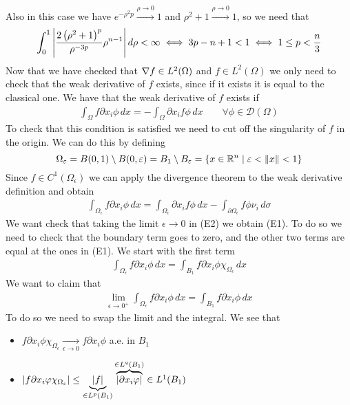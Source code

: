 Also in this case we have \(e^{-\rho^2 p} \overset{\rho \to 0}{\longrightarrow} 1\) and \(\rho^2 + 1 \overset{\rho \to 0}{\longrightarrow} 1\), so we need that
\[
    \begin{split}
        \int_0^1 \abs{\frac{2 \left(\rho^2 + 1\right)^p} {\rho^{-3p}} \rho^{n-1}} \, d\rho < \infty \iff 3p - n + 1 < 1 \iff 1 \leq p < \frac{n}{3}
    \end{split}
\]
Now that we have checked that \(\nabla f \in L^2(\Omega)\) and \(f \in L^2(\Omega)\) we only need to check that the weak derivative of \(f\) exists, since if it exists it is equal to the classical one. We have that the weak derivative of \(f\) exists if
\[
    \begin{split}
        \int_\Omega f \partial x_i \phi \, dx = - \int_\Omega \partial x_i f \phi \, dx \qquad \forall \phi \in \mathcal{D}(\Omega)
    \end{split}
    \tag*{E1}
\]
To check that this condition is satisfied we need to cut off the singularity of \(f\) in the origin. We can do this by defining
\[
    \Omega_\varepsilon = B(0, 1) \setminus B(0, \varepsilon) = B_1 \setminus B_\varepsilon = \left\{ x \in \mathbb{R}^n \mid \varepsilon < \norm{x} < 1 \right\}
\]
Since \(f \in C^1(\Omega_\epsilon)\) we can apply the divergence theorem to the weak derivative definition and obtain
\[
    \begin{split}
        \int_{\Omega_\epsilon} f \partial x_i \phi \, dx = \int_{\Omega_\epsilon} \partial x_i f \phi \, dx - \int_{\partial\Omega_\epsilon} f \phi \nu_i \, d\sigma
    \end{split}
    \tag*{E2}
\]
We want check that taking the limit \(\epsilon \to 0\) in (E2) we obtain (E1). To do so we need to check that the boundary term goes to zero, and the other two terms are equal at the ones in (E1). We start with the first term
\[
    \begin{split}
        \int_{\Omega_\epsilon} f \partial x_i \phi \, dx = \int_{B_1} f \partial x_i \phi \chi_{\Omega_\epsilon} \, dx
    \end{split}
\]
We want to claim that 
\[
    \begin{split}
        \lim_{\epsilon \to 0^+} \int_{\Omega_\epsilon} f \partial x_i \phi \, dx = \int_{B_1} f \partial x_i \phi \, dx
    \end{split}
\]
To do so we need to swap the limit and the integral. We see that 
\begin{itemize}
    \item \(f \partial x_i \phi \chi_{\Omega_\epsilon} \underset{\epsilon \to 0}{\longrightarrow} f \partial x_i \phi\) a.e. in \(B_1\)
    \item \(\abs{f \partial x_i \varphi \chi_{\Omega_\varepsilon}} \leq \underbrace{\abs{f}}_{\in L^p(B_1)} \overbrace{\abs{\partial x_i \varphi}}^{\in L^q(B_1)} \in L^1(B_1)\)
\end{itemize}
